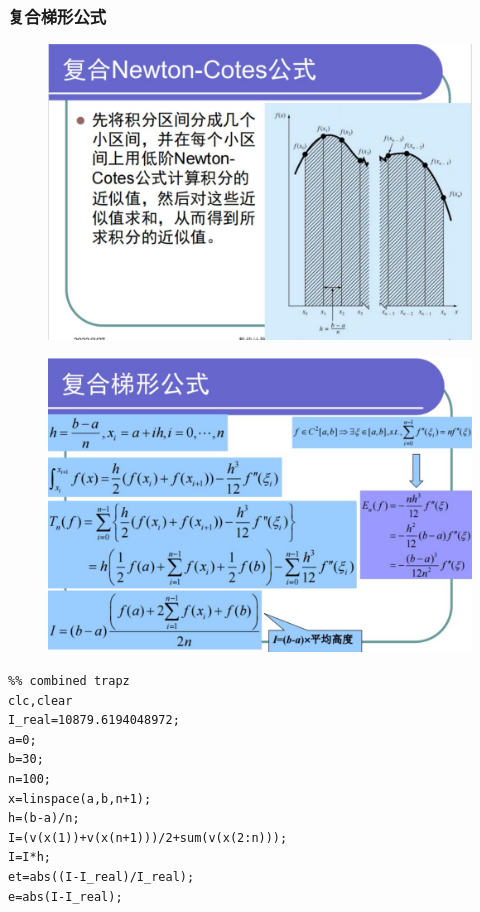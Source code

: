 \documentclass[a4paper,12pt]{ctexart}
\begin{document}
\subsubsection{复合梯形公式}
\begin{figure}[H]
    \centering
    \includegraphics[width=14cm]{第五章作业/n-c4.jpg}
\end{figure}
\begin{figure}[H]
    \centering
    \includegraphics[width=14cm]{第五章作业/futi.jpg}
\end{figure}
\begin{lstlisting}
%% combined trapz
clc,clear
I_real=10879.6194048972;
a=0;
b=30;
n=100;
x=linspace(a,b,n+1); 
h=(b-a)/n;
I=(v(x(1))+v(x(n+1)))/2+sum(v(x(2:n))); 
I=I*h;
et=abs((I-I_real)/I_real);
e=abs(I-I_real);
\end{lstlisting}
\end{document}
